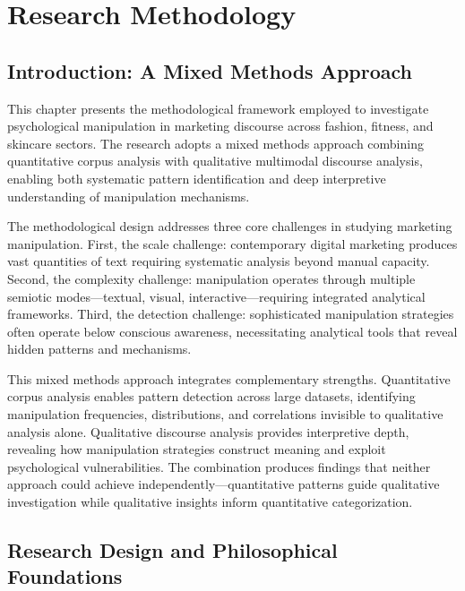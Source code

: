 
\chapter{Research Methodology}
\label{ch:methodology}

\section{Introduction: A Mixed Methods Approach}
\label{sec:method_intro}

This chapter presents the methodological framework employed to investigate psychological manipulation in marketing discourse across fashion, fitness, and skincare sectors. The research adopts a mixed methods approach combining quantitative corpus analysis with qualitative multimodal discourse analysis, enabling both systematic pattern identification and deep interpretive understanding of manipulation mechanisms.

The methodological design addresses three core challenges in studying marketing manipulation. First, the scale challenge: contemporary digital marketing produces vast quantities of text requiring systematic analysis beyond manual capacity. Second, the complexity challenge: manipulation operates through multiple semiotic modes—textual, visual, interactive—requiring integrated analytical frameworks. Third, the detection challenge: sophisticated manipulation strategies often operate below conscious awareness, necessitating analytical tools that reveal hidden patterns and mechanisms.

This mixed methods approach integrates complementary strengths. Quantitative corpus analysis enables pattern detection across large datasets, identifying manipulation frequencies, distributions, and correlations invisible to qualitative analysis alone. Qualitative discourse analysis provides interpretive depth, revealing how manipulation strategies construct meaning and exploit psychological vulnerabilities. The combination produces findings that neither approach could achieve independently—quantitative patterns guide qualitative investigation while qualitative insights inform quantitative categorization.

\section{Research Design and Philosophical Foundations}
\label{sec:design}

